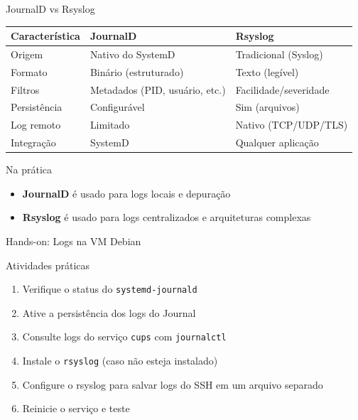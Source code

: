 \documentclass{if-beamer}
\begin{document}

\begin{frame}{JournalD vs Rsyslog}
	\begin{table}
		\centering
		\small
		\begin{tabular}{|p{3cm}|p{3.5cm}|p{3.5cm}|}
			\hline
			\textbf{Característica} & \textbf{JournalD} & \textbf{Rsyslog} \\
			\hline
			Origem & Nativo do SystemD & Tradicional (Syslog) \\
			\hline
			Formato & Binário (estruturado) & Texto (legível) \\
			\hline
			Filtros & Metadados (PID, usuário, etc.) & Facilidade/severidade \\
			\hline
			Persistência & Configurável & Sim (arquivos) \\
			\hline
			Log remoto & Limitado & Nativo (TCP/UDP/TLS) \\
			\hline
			Integração & SystemD & Qualquer aplicação \\
			\hline
		\end{tabular}
	\end{table}
\end{frame}
\begin{frame}	
	\begin{block}{Na prática}
		\begin{itemize}
			\item \textbf{JournalD} é usado para logs locais e depuração
			\item \textbf{Rsyslog} é usado para logs centralizados e arquiteturas complexas
		\end{itemize}
	\end{block}
\end{frame}


\begin{frame}{Hands-on: Logs na VM Debian}
	\begin{block}{Atividades práticas}
		\begin{enumerate}
			\item Verifique o status do \texttt{systemd-journald}
			\item Ative a persistência dos logs do Journal
			\item Consulte logs do serviço \texttt{cups} com \texttt{journalctl}
			\item Instale o \texttt{rsyslog} (caso não esteja instalado)
			\item Configure o rsyslog para salvar logs do SSH em um arquivo separado
			\item Reinicie o serviço e teste
		\end{enumerate}
	\end{block}
\end{frame}
\end{document}
